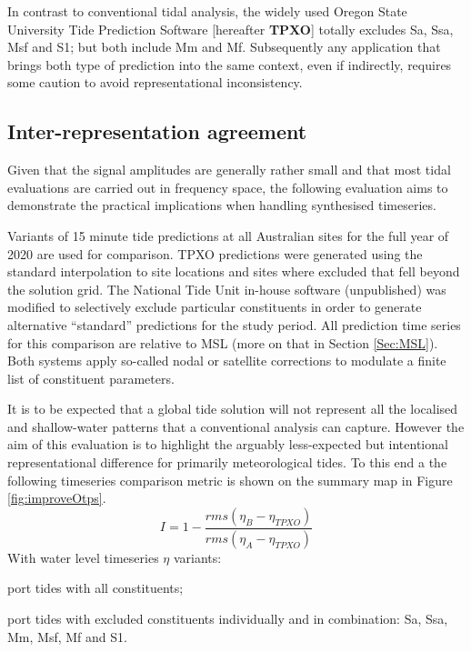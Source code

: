 In contrast to conventional tidal analysis, the widely used Oregon State University Tide Prediction Software \citep{Egbert:2002ug} [hereafter \textbf{TPXO}] totally excludes Sa, Ssa, Msf and S1; but both include Mm and Mf.  Subsequently any application that brings both type of prediction into the same context, even if indirectly, requires some caution to avoid representational inconsistency. 


\subsection{Inter-representation agreement}
Given that the signal amplitudes are generally rather small and that most tidal evaluations are carried out in frequency space, the following evaluation aims to demonstrate the practical implications when handling synthesised timeseries.

Variants of 15 minute tide predictions at all Australian sites for the full year of 2020 are used for comparison.   TPXO predictions were generated using the standard interpolation to site locations and sites where excluded that fell beyond the solution grid.   The National Tide Unit in-house software (unpublished) was modified to selectively exclude particular constituents in order to generate alternative ``standard'' predictions for the study period.  All prediction time series for this comparison are relative to MSL (more on that in Section \ref{Sec:MSL}).   Both systems apply so-called nodal or satellite corrections to modulate a finite list of constituent parameters.   

It is to be expected that a global tide solution will not represent all the localised and shallow-water patterns that a conventional analysis can capture.   However the aim of this evaluation is to highlight the arguably less-expected but intentional representational difference for primarily meteorological tides.   To this end a the following timeseries comparison metric is shown on the summary map in Figure \ref{fig:improveOtps}.
\begin{equation}
    I = 1- \frac{rms(\eta_{B}-\eta_{TPXO})}{rms(\eta_{A}-\eta_{TPXO})}
    \label{eq:improvment}
\end{equation}
With water level timeseries $\eta$ variants:
\begin{inparaenum}
[A)]
    \item port tides with all constituents; 
    \item port tides with excluded constituents individually and in combination: Sa, Ssa, Mm, Msf, Mf and S1.
\end{inparaenum}

